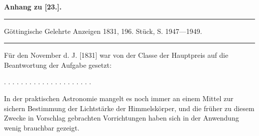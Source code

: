 \clearpage\begingroup
{}
\begin{center}
\textbf{Anhang zu [23.].}\par\medskip
\textbf{}\par\medskip
\rule{.76\linewidth}{.4pt}\par\smallskip
{\footnotesize Göttingische Gelehrte Anzeigen 1831, 196. Stück, S. 1947---1949.}\par\smallskip
\rule{.76\linewidth}{.4pt}
\end{center}
\noindent\hspace*{\parindent}Für den November d. J. [1831] war von der  Classe der Hauptpreis auf die Beantwortung der Aufgabe gesetzt:
\par\noindent . . . . . . . . . . . . . . . . . . . . .\par
\noindent\hspace*{\parindent}In der praktischen Astronomie mangelt es noch immer an einem Mittel zur sichern Bestimmung der Lichtstärke der Himmelskörper, und die früher zu diesem Zwecke in Vorschlag gebrachten Vorrichtungen haben sich in der Anwendung wenig brauchbar gezeigt.


